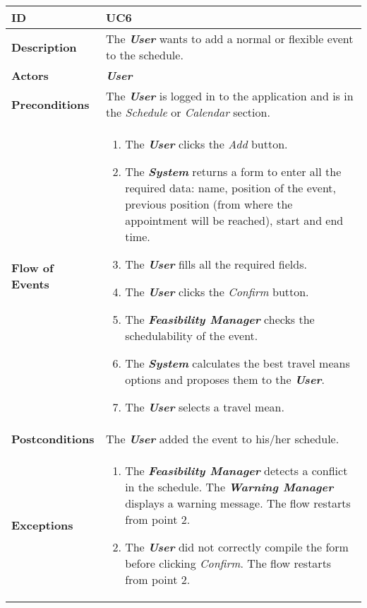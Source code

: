 \begin{tabularx}{\linewidth}{| l | X|}
	\hline
	\textbf{ID} & UC6\\
	
	\hline
	\textbf{Description} & The \textbf{\textit{User}} wants to add a normal or flexible event to the schedule.\\
	
	\hline
	\textbf{Actors} & \textbf{\textit{User}}\\
	
	\hline
	\textbf{Preconditions} & The \textbf{\textit{User}} is logged in to the application and is in the \textit{Schedule} or \textit{Calendar} section.\\
	
	\hline
	\textbf{Flow of Events} & \parbox{0.7\textwidth}{\begin{enumerate}
			\item The \textbf{\textit{User}} clicks the \textit{Add} button.
			\item The \textbf{\textit{System}} returns a form to enter all the required data: name, position of the event, previous position (from where the appointment will be reached), start and end time.
			\item The \textbf{\textit{User}} fills all the required fields.
			\item The \textbf{\textit{User}} clicks the \textit{Confirm} button.
			\item The \textbf{\textit{Feasibility Manager}} checks the schedulability of the event.
			\item The \textbf{\textit{System}} calculates the best travel means options and proposes them to the \textbf{\textit{User}}.
			\item The \textbf{\textit{User}} selects a travel mean.
	\end{enumerate}}\\
	\hline
	
	\textbf{Postconditions} & The \textbf{\textit{User}} added the event to his/her schedule. \\
	
	\hline
	\textbf{Exceptions} & \parbox{0.7\textwidth}{ \begin{enumerate}
		\item The \textbf{\textit{Feasibility Manager}} detects a conflict in the schedule. The \textbf{\textit{Warning Manager}} displays a warning message. The flow restarts from point 2.
		\item The \textbf{\textit{User}} did not correctly compile the form before clicking \textit{Confirm}. The flow restarts from point 2.
	\end{enumerate}}\\
	
	\hline
	
\end{tabularx}

